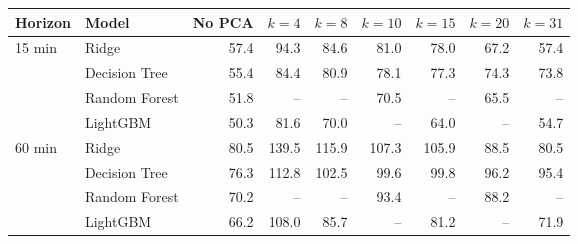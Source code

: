 \begin{tabular}{llrrrrrrr}
\toprule
Horizon & Model & No PCA & $k=4$ & $k=8$ & $k=10$ & $k=15$ & $k=20$ & $k=31$ \\
\midrule
15 min & Ridge & 57.4 & 94.3 & 84.6 & 81.0 & 78.0 & 67.2 & 57.4 \\
 & Decision Tree & 55.4 & 84.4 & 80.9 & 78.1 & 77.3 & 74.3 & 73.8 \\
 & Random Forest & 51.8 & -- & -- & 70.5 & -- & 65.5 & -- \\
 & LightGBM & 50.3 & 81.6 & 70.0 & -- & 64.0 & -- & 54.7 \\
60 min & Ridge & 80.5 & 139.5 & 115.9 & 107.3 & 105.9 & 88.5 & 80.5 \\
 & Decision Tree & 76.3 & 112.8 & 102.5 & 99.6 & 99.8 & 96.2 & 95.4 \\
 & Random Forest & 70.2 & -- & -- & 93.4 & -- & 88.2 & -- \\
 & LightGBM & 66.2 & 108.0 & 85.7 & -- & 81.2 & -- & 71.9 \\
\bottomrule
\end{tabular}
